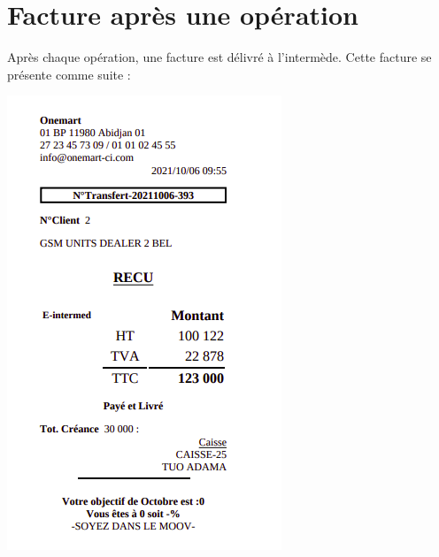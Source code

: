 	\section{Facture après une opération}
		Après chaque opération, une facture est délivré à l'intermède. Cette facture se présente comme suite :
		\begin{center}
			\includegraphics[scale=0.7]{chap_3/facture.png}
			\label{Facture}
		\end{center}
